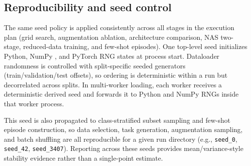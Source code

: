 \documentclass[cameraready]{Interspeech}
\begin{document}
\subsection{Reproducibility and seed control}
The same seed policy is applied consistently across all stages in the execution plan (grid search, augmentation ablation, architecture comparison, NAS two-stage, reduced-data training, and few-shot episodes). One top-level seed initializes Python, NumPy \cite{harris2020array}, and PyTorch \cite{NEURIPS2019_9015} RNG states at process start. Dataloader randomness is controlled with split-specific seeded generators (train/validation/test offsets), so ordering is deterministic within a run but decorrelated across splits. In multi-worker loading, each worker receives a deterministic derived seed and forwards it to Python and NumPy RNGs inside that worker process.

This seed is also propagated to class-stratified subset sampling and few-shot episode construction, so data selection, task generation, augmentation sampling, and batch shuffling are all reproducible for a given run directory (e.g., \texttt{seed\_0}, \texttt{seed\_42}, \texttt{seed\_3407}). Reporting across these seeds provides mean/variance-style stability evidence rather than a single-point estimate.
\end{document}
